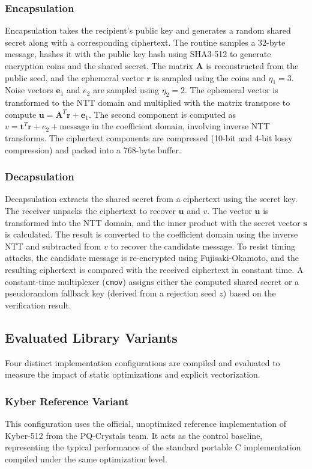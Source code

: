 \subsubsection{Encapsulation}
Encapsulation takes the recipient's public key and generates a random shared secret along with a corresponding ciphertext. The routine samples a 32-byte message, hashes it with the public key hash using SHA3-512 to generate encryption coins and the shared secret. The matrix $\mathbf{A}$ is reconstructed from the public seed, and the ephemeral vector $\mathbf{r}$ is sampled using the coins and $\eta_1 = 3$. Noise vectors $\mathbf{e}_1$ and $e_2$ are sampled using $\eta_2 = 2$. The ephemeral vector is transformed to the NTT domain and multiplied with the matrix transpose to compute $\mathbf{u} = \mathbf{A}^T\mathbf{r} + \mathbf{e}_1$. The second component is computed as $v = \mathbf{t}^T\mathbf{r} + e_2 + \text{message}$ in the coefficient domain, involving inverse NTT transforms. The ciphertext components are compressed (10-bit and 4-bit lossy compression) and packed into a 768-byte buffer.

\subsubsection{Decapsulation}
Decapsulation extracts the shared secret from a ciphertext using the secret key. The receiver unpacks the ciphertext to recover $\mathbf{u}$ and $v$. The vector $\mathbf{u}$ is transformed into the NTT domain, and the inner product with the secret vector $\mathbf{s}$ is calculated. The result is converted to the coefficient domain using the inverse NTT and subtracted from $v$ to recover the candidate message. To resist timing attacks, the candidate message is re-encrypted using Fujisaki-Okamoto, and the resulting ciphertext is compared with the received ciphertext in constant time. A constant-time multiplexer (\texttt{cmov}) assigns either the computed shared secret or a pseudorandom fallback key (derived from a rejection seed $z$) based on the verification result.

\subsection{Evaluated Library Variants}
\label{sub:library_variants}

Four distinct implementation configurations are compiled and evaluated to measure the impact of static optimizations and explicit vectorization.

\subsubsection{Kyber Reference Variant}
This configuration uses the official, unoptimized reference implementation of Kyber-512 from the PQ-Crystals team. It acts as the control baseline, representing the typical performance of the standard portable C implementation compiled under the same optimization level.

